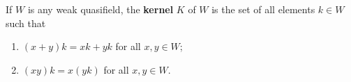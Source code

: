 If $W$ is any weak quasifield, the \textbf{kernel} $K$ of $W$ is the set of all elements $k \in W$ such that
\begin{enumerate}
\item[(i)] $(x + y)k = xk + yk$ for all $x, y \in W$;
\item[(ii)] $(xy)k = x(yk)$ for all $x, y \in W$.
\end{enumerate}
